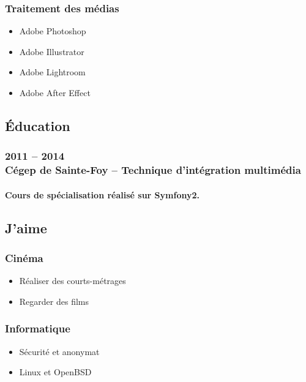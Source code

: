 \documentclass{resume}
\begin{document}
\begin{multicols}{2}
{\begin{multicols}{2}
			\subsubsection*{Traitement des médias}
			\begin{itemize}
				\scriptsize
				\item Adobe Photoshop
				\item Adobe Illustrator
				\item Adobe Lightroom
				\item Adobe After Effect
			\end{itemize}
		 \end{multicols}}
	\end{multicols}

	\vspace{2.5mm}

	\begin{multicols}{2}
		\subsection*{Éducation}
			\subsubsection*{2011 – 2014 \\ Cégep de Sainte-Foy – Technique d'intégration multimédia}
			\paragraph{Cours de spécialisation réalisé sur Symfony2.}

		\columnbreak

		\subsection*{J'aime}
			{\setlength\multicolsep{0pt}
			 \begin{multicols}{2}
				\subsubsection*{Cinéma}
				\begin{itemize}
					\scriptsize
					\item Réaliser des courts-métrages
					\item Regarder des films
				\end{itemize}

				\subsubsection*{Informatique}
				\begin{itemize}
					\scriptsize
					\item Sécurité et anonymat
					\item Linux et OpenBSD
				\end{itemize}
			 \end{multicols}}
	\end{multicols}
\end{document}
